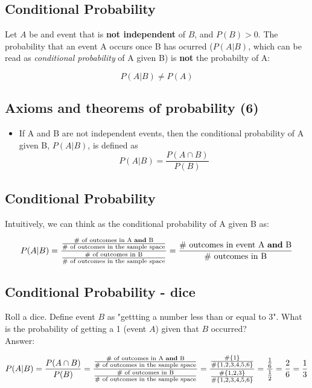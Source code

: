 \documentclass[11pt]{article}
\begin{document}
	\subsection*{Conditional Probability}
	
	Let $A$ be and event that is \textbf{not independent} of $B$, and $P(B)>0$. The probability that an event A occurs once B has ocurred ($P(A|B)$, which can be read as \emph{conditional probability} of A given B) is \textbf{not} the probabilty of A:
	
	\[P(A|B) \neq P(A)\]
	
	\subsection*{Axioms and theorems of probability (6)}
	\begin{itemize}
		\item If A and B are not independent events, then the conditional probability of A given B, $P(A|B)$, is defined as
	\[P(A|B) = \frac{P(A\cap B)}{P(B)}\]
 
	\end{itemize}

	\subsection*{Conditional Probability}
	Intuitively, we can think as the conditional probability of A given B as:

		\[P(A|B) = \frac{
						\frac{
							\text{\# of outcomes in A \textbf{and} B}
							}
							{\text{\# of outcomes in the sample space}
							}
						}
						{
						\frac{
							\text{\# of outcomes in B}
							}
							{\text{\# of outcomes in the sample space}
							}
						}
		=\frac{\text{\# outcomes in event A \textbf{and} B}}
							{\text{\# outcomes in B}
							}\]



	\subsection*{Conditional Probability - dice}
	
	Roll a dice. Define event $B$ as "gettting a number less than or equal to 3". What is the probability of getting a 1 (event $A$) given that $B$ occurred?\\
	 
	Answer:

	\[P(A|B) = \frac{P(A\cap B)}{P(B)} = 
	\frac{
						\frac{
							\text{\# of outcomes in A \textbf{and} B}
							}
							{\text{\# of outcomes in the sample space}
							}
						}
						{
						\frac{
							\text{\# of outcomes in B}
							}
							{\text{\# of outcomes in the sample space}
							}
						} =
						\frac
							{\frac{\#\{1\}}{\#\{1,2,3,4,5,6\}}}
							{\frac{\#\{1,2,3\}}{\#\{1,2,3,4,5,6\}}} = 
							\frac{\frac{1}{6}}{\frac{1}{2}} = \frac{2}{6} = \frac{1}{3}\]
	
\end{document}

